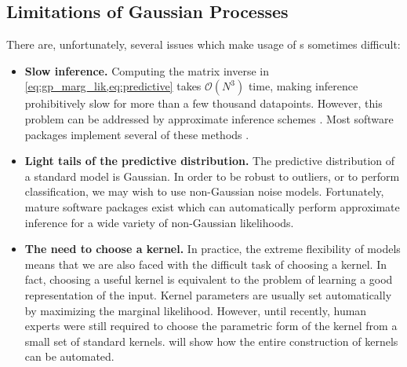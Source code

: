 \subsection{Limitations of Gaussian Processes}

There are, unfortunately, several issues which make usage of \gp{}s sometimes difficult:

\begin{itemize}

\item {\bf Slow inference.}
Computing the matrix inverse in \cref{eq:gp_marg_lik,eq:predictive} takes $\mathcal{O}(N^3)$ time, making inference prohibitively slow for more than a few thousand datapoints.
However, this problem can be addressed by approximate inference schemes \citep{snelson2006sparse, quinonero2005unifying, hensman2013gaussian}.  Most \gp{} software packages implement several of these methods \citep{GPy, GPML, VanRiiHarJylVeh14}.

\item {\bf Light tails of the predictive distribution.}
The predictive distribution of a standard \gp{} model is Gaussian.
In order to be robust to outliers, or to perform classification, we may wish to use non-Gaussian noise models.
Fortunately, mature software packages exist which can automatically perform approximate inference for a wide variety of non-Gaussian likelihoods.

\item {\bf The need to choose a kernel.}
In practice, the extreme flexibility of \gp{} models means that we are also faced with the difficult task of choosing a kernel.
In fact, 
choosing a useful kernel is equivalent to the problem of learning a good representation of the input.
Kernel parameters are usually set automatically by maximizing the marginal likelihood.
However, until recently, human experts were still required to choose the parametric form of the kernel from a small set of standard kernels.
 will show how the entire construction of kernels can be automated.
\end{itemize}





